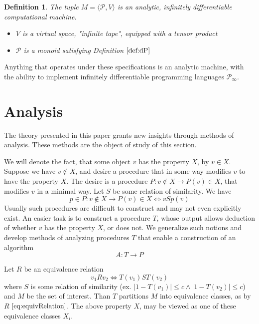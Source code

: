 \documentclass{article}
\newcommand{\dP}{\mathcal{P}}
\newtheorem{definicija}{Definition}[section]
\begin{document}
\begin{definicija}
The tuple $M=\langle\dP, V\rangle$ is an analytic, infinitely  differentiable computational machine.
   
    \begin{itemize}
    \item
    $V$ is a virtual space, "infinite tape", equipped with a tensor product
    \item
    $\dP$ is a monoid satisfying Definition $\ref{def:dP}$
    \end{itemize}
  \end{definicija}
Anything that operates under these specifications is an analytic machine, with the ability to implement infinitely differentiable programming languages $\dP_\infty$.
  
\section{Analysis}
  
   The theory presented in this paper grants new insights through methods of analysis.  These methods are the object of study of this section.
  
  We will denote the fact, that some object $v$ has the property $X$, by $v\in X$. Suppose we have $v\notin X$, and desire a procedure that in some way modifies $v$ to have the property $X$. The desire is a procedure $P:v\notin X\to P(v)\in X$, that modifies $v$ in a minimal way. Let $S$ be some relation of similarity. We have
  \begin{equation}
  p\in P:v\notin X\to P(v)\in X\iff vSp(v)
  \end{equation}
  Usually such procedures are difficult to construct and may not even explicitly exist. An easier task is to construct a procedure $T$, whose output allows deduction of whether $v$ has the property $X$, or does not. We generalize such notions and develop methods of analyzing procedures $T$ that enable a construction of an algorithm
  \begin{equation}\label{eq:algA}
  A:T\to P
  \end{equation}
  
  Let $R$ be an equivalence relation 
  \begin{equation}\label{eq:equivRelation}
  v_1Rv_2\iff T(v_1)ST(v_2)
  \end{equation}
  where $S$ is some relation of similarity (ex. $\lvert1- T(v_1)\rvert\le c\land\lvert1- T(v_2)\rvert\le c$) and $M$ be the set of interest. Than $T$ partitions $M$ into equivalence classes, as by $R$ $\eqref{eq:equivRelation}$. The above property $X$, may be viewed as one of these equivalence classes $X_i$.
  
\end{document}

